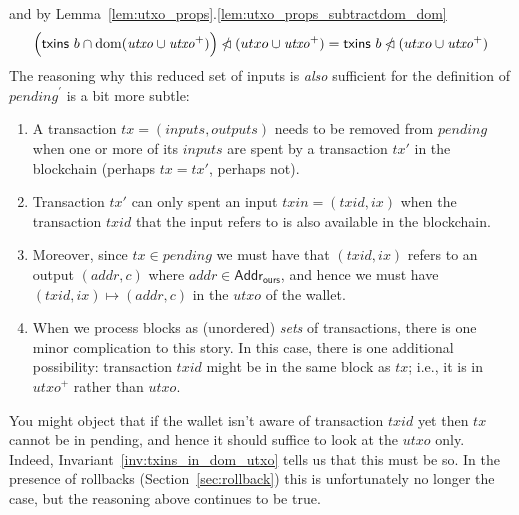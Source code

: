\documentclass{article}
\newcommand{\restrictdom}{\lhd}
\newcommand{\subtractdom}{\mathbin{\slashed{\restrictdom}}}
\DeclareMathOperator{\dom}{dom}
\begin{document}
%
and by Lemma~\ref{lem:utxo_props}.\ref{lem:utxo_props_subtractdom_dom}
%
\begin{equation*}
  \Bigl( \mathsf{txins} ~ b \cap \dom (\mathit{utxo} \cup \mathit{utxo}^+) \Bigr) \subtractdom (utxo \cup \mathit{utxo}^+) \\
= \mathsf{txins} ~ b \subtractdom (utxo \cup \mathit{utxo}^+)
\end{equation*}
%
The reasoning why this reduced set of inputs is \emph{also} sufficient for
the definition of $\mathit{pending}^\prime$ is a bit more subtle:
%
\begin{enumerate}

\item A transaction $\mathit{tx} = (\mathit{inputs}, \mathit{outputs})$ needs to
be removed from $\mathit{pending}$ when one or more of its $\mathit{inputs}$ are
spent by a transaction $\mathit{tx}'$ in the blockchain (perhaps $\mathit{tx} =
\mathit{tx}'$, perhaps not).

\item Transaction $\mathit{tx}'$ can only spent an input $\mathit{\mathit{txin}} =
(\mathit{\mathit{txid}}, ix)$ when the transaction $\mathit{\mathit{txid}}$ that
the input refers to is also available in the blockchain.

\item Moreover, since $\mathit{tx} \in \mathit{pending}$ we must have that
$(\mathit{\mathit{txid}}, ix)$ refers to an output $(\mathit{addr}, c)$
where $\mathit{addr} \in \mathsf{Addr}_\mathsf{ours}$, and hence we must have
$(\mathit{\mathit{txid}}, ix) \mapsto (\mathit{addr}, c)$ in the
$\mathit{\mathit{utxo}}$ of the wallet.

\item When we process blocks as (unordered) \emph{sets} of transactions, there is
one minor complication to this story. In this case, there is one additional
possibility: transaction $\mathit{\mathit{txid}}$ might be in the same block as
$\mathit{tx}$; i.e., it is in $\mathit{utxo}^+$ rather than $\mathit{utxo}$.

\end{enumerate}

You might object that if the wallet isn't aware of transaction
$\mathit{\mathit{txid}}$ yet then $\mathit{tx}$ cannot be in pending, and hence
it should suffice to look at the $\mathit{utxo}$ only. Indeed,
Invariant~\ref{inv:txins_in_dom_utxo} tells us that this must be so. In the presence of
rollbacks (Section~\ref{sec:rollback}) this is unfortunately no longer the case,
but the reasoning above continues to be true.
\end{document}
